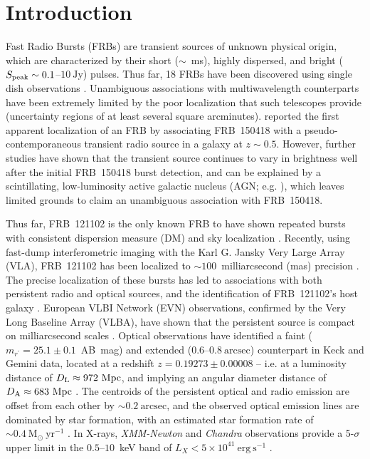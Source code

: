 \documentclass[twocolumn]{aastex61}
\newcommand{\frb}{FRB~121102\xspace}
\newcommand{\msun}{\mathrm{M_{\odot}}\xspace}
\begin{document}
\section{Introduction} \label{sec:intro}

Fast Radio Bursts (FRBs) are transient sources of unknown physical origin, which are characterized by their short ($\sim$~ms), highly dispersed, and bright ($S_{\rm peak} \sim 0.1$--$10~\mathrm{Jy}$) pulses. Thus far, 18 FRBs have been discovered using single dish observations \citep[e.g.,][]{lbm+07,tsb+13,pbj+16}. Unambiguous associations with multiwavelength counterparts have been extremely limited by the poor localization that such telescopes provide (uncertainty regions of at least several square arcminutes). \citet{keane2016} reported the first apparent localization of an FRB by associating FRB~150418 with a pseudo-contemporaneous transient radio source in a galaxy at $z \sim 0.5$. However, further studies have shown that the transient source continues to vary in brightness well after the initial FRB~150418 burst detection, and can be explained by a scintillating, low-luminosity active galactic nucleus (AGN; e.g. \citealt{wb16,gmg+16,bassa2016,johnston2016}), which leaves limited grounds to claim an unambiguous association with FRB~150418.

Thus far, \frb is the only known FRB to have shown repeated bursts with consistent dispersion measure (DM) and sky localization \citep{sch+14,ssh+16a,ssh+16b}. Recently, using fast-dump interferometric imaging with the Karl G. Jansky Very Large Array (VLA), \frb has been localized to $\sim 100$~milliarcsecond (mas) precision \citep{chatterjee2017}. The precise localization of these bursts has led to associations with both persistent radio and optical sources, and the identification of \frb's host galaxy \citep{chatterjee2017,tendulkar2017}.  European VLBI Network (EVN) observations, confirmed by the Very Long Baseline Array (VLBA), have shown that the persistent source is compact on milliarcsecond scales \citep{chatterjee2017}.  Optical observations have identified a faint ($m_{r^{\prime}} = 25.1 \pm 0.1$~AB~mag) and extended ($0.6$--$0.8~\mathrm{arcsec}$) counterpart in Keck and Gemini data, located at a redshift $z = 0.19273 \pm 0.00008$ -- i.e. at a luminosity distance of $D_{\rm L} \approx 972\ \mathrm{Mpc}$, and implying an angular diameter distance of $D_{\rm A} \approx 683\ \mathrm{Mpc}$ \citep{tendulkar2017}. The centroids of the persistent optical and radio emission are offset from each other by $\sim 0.2~\mathrm{arcsec}$, and the observed optical emission lines are dominated by star formation, with an estimated star formation rate of $\sim 0.4\ \msun\ \mathrm{yr}^{-1}$ \citep{tendulkar2017}.  In X-rays, {\em XMM-Newton} and {\em Chandra} observations provide a 5-$\sigma$ upper limit in the $0.5$--$10$~keV band of $L_X < 5 \times 10^{41}\ \mathrm{erg\ s^{-1}}$ \citep{chatterjee2017}.
\end{document}
